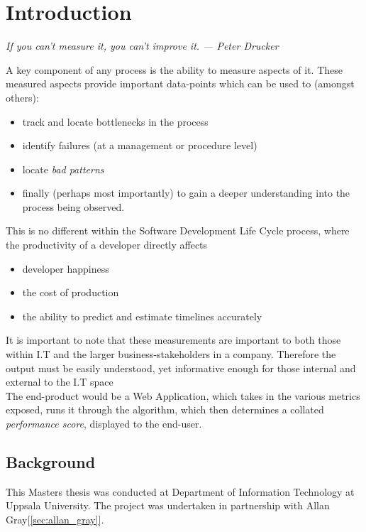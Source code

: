 \section{Introduction}

\begin{center}
  \textit{If you can’t measure it, you can’t improve it. — Peter Drucker}
\end{center}

\noindent A key component of any process is the ability to measure aspects of it. These measured aspects provide important data-points which can be used to (amongst others):
\begin{itemize}
  \item track and locate bottlenecks in the process
  \item identify failures (at a management or procedure level)
  \item locate \textit{bad patterns}
  \item finally (perhaps most importantly) to gain a deeper understanding into the process being observed.
\end{itemize}

\noindent This is no different within the Software Development Life Cycle process, where the productivity of a developer directly affects
\begin{itemize}
  \item developer happiness
  \item the cost of production
  \item the ability to predict and estimate timelines accurately
\end{itemize}
It is important to note that these measurements are important to both those within I.T and the larger business-stakeholders in a company.
Therefore the output must be easily understood, yet informative enough for those internal and external to the I.T space\\

\noindent The end-product would be a Web Application, which takes in the various metrics exposed, runs it through the algorithm, which then determines a collated \textit{performance score}, displayed to the end-user.


\subsection{Background}
This Masters thesis was conducted at Department of Information Technology at Uppsala University. The project was undertaken in partnership with Allan Gray[\ref{sec:allan_gray}].

